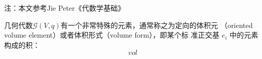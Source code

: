 
注：本文参考Jie Peter《代数学基础》

几何代数$\mathcal G(V,q)$有一个非常特殊的元素，通常称之为定向的体积元
（oriented volume element）或者体积形式（volume form），即某个标
准正交基 ${e_i}$ 中的元素构成的积：
$$vol$$